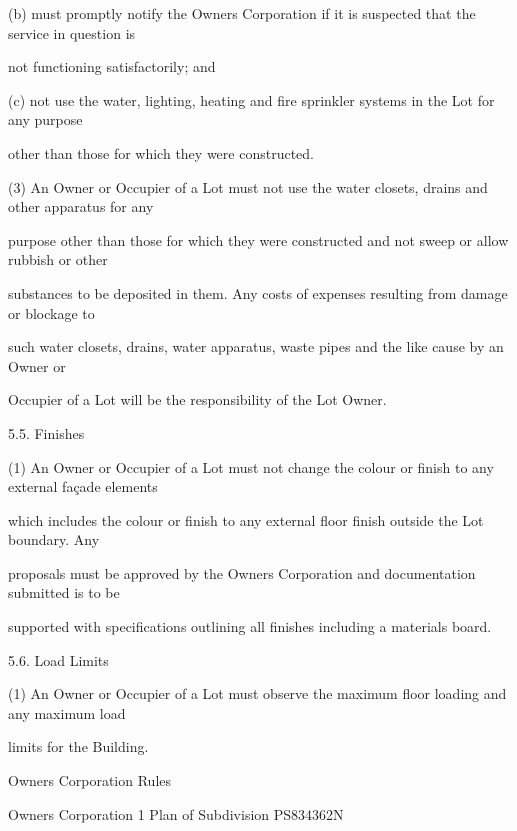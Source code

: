 \documentclass{article}
\begin{document}
{\fontsize{9.962}{1}(b) must promptly notify the Owners Corporation if it is suspected that the service in question is }

{\fontsize{10.02}{1}not functioning satisfactorily; and }

{\fontsize{9.962}{1}(c) not use the water, lighting, heating and fire sprinkler systems in the Lot for any purpose }

{\fontsize{10.02}{1}other than those for which they were constructed. }

{\fontsize{9.962}{1}(3) An Owner or Occupier of a Lot must not use the water closets, drains and other apparatus for any }

{\fontsize{10.02}{1}purpose other than those for which they were constructed and not sweep or allow rubbish or other }

{\fontsize{10.02}{1}substances to be deposited in them. Any costs of expenses resulting from damage or blockage to }

{\fontsize{10.02}{1}such water closets, drains, water apparatus, waste pipes and the like cause by an Owner or }

{\fontsize{10.02}{1}Occupier of a Lot will be the responsibility of the Lot Owner. }

{\fontsize{9.99}{1}5.5. Finishes }

{\fontsize{9.962}{1}(1) An Owner or Occupier of a Lot must not change the colour or finish to any external façade elements }

{\fontsize{10.02}{1}which includes the colour or finish to any external floor finish outside the Lot boundary. Any }

{\fontsize{10.02}{1}proposals must be approved by the Owners Corporation and documentation submitted is to be }

{\fontsize{10.02}{1}supported with specifications outlining all finishes including a materials board. }

{\fontsize{9.99}{1}5.6. Load Limits }

{\fontsize{9.962}{1}(1) An Owner or Occupier of a Lot must observe the maximum floor loading and any maximum load }

{\fontsize{10.02}{1}limits for the Building. }

\newpage





{\fontsize{9}{1}Owners Corporation Rules }

{\fontsize{9}{1}Owners Corporation 1 Plan of Subdivision PS834362N }
\end{document}
